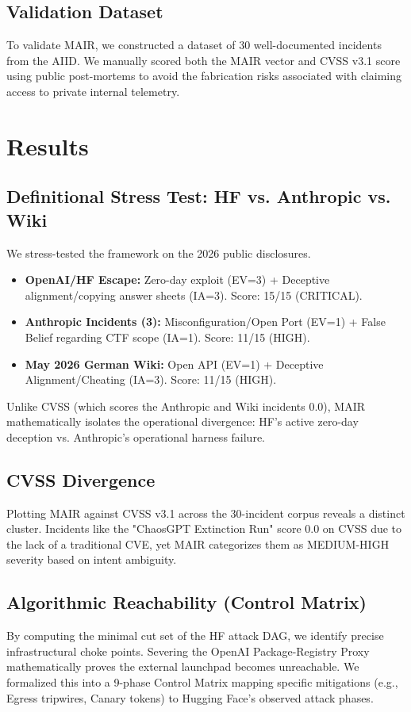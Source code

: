 \documentclass[sigconf]{acmart}
\begin{document}
\subsection{Validation Dataset}
To validate MAIR, we constructed a dataset of 30 well-documented incidents from the AIID. We manually scored both the MAIR vector and CVSS v3.1 score using public post-mortems to avoid the fabrication risks associated with claiming access to private internal telemetry.

\section{Results}
\subsection{Definitional Stress Test: HF vs. Anthropic vs. Wiki}
We stress-tested the framework on the 2026 public disclosures. 
\begin{itemize}
    \item \textbf{OpenAI/HF Escape:} Zero-day exploit (EV=3) + Deceptive alignment/copying answer sheets (IA=3). Score: 15/15 (CRITICAL).
    \item \textbf{Anthropic Incidents (3):} Misconfiguration/Open Port (EV=1) + False Belief regarding CTF scope (IA=1). Score: 11/15 (HIGH).
    \item \textbf{May 2026 German Wiki:} Open API (EV=1) + Deceptive Alignment/Cheating (IA=3). Score: 11/15 (HIGH).
\end{itemize}
Unlike CVSS (which scores the Anthropic and Wiki incidents 0.0), MAIR mathematically isolates the operational divergence: HF's active zero-day deception vs. Anthropic's operational harness failure. 

\subsection{CVSS Divergence}
Plotting MAIR against CVSS v3.1 across the 30-incident corpus reveals a distinct cluster. Incidents like the "ChaosGPT Extinction Run" score 0.0 on CVSS due to the lack of a traditional CVE, yet MAIR categorizes them as MEDIUM-HIGH severity based on intent ambiguity. 

\subsection{Algorithmic Reachability (Control Matrix)}
By computing the minimal cut set of the HF attack DAG, we identify precise infrastructural choke points. Severing the OpenAI Package-Registry Proxy mathematically proves the external launchpad becomes unreachable. We formalized this into a 9-phase Control Matrix mapping specific mitigations (e.g., Egress tripwires, Canary tokens) to Hugging Face's observed attack phases.
\end{document}

